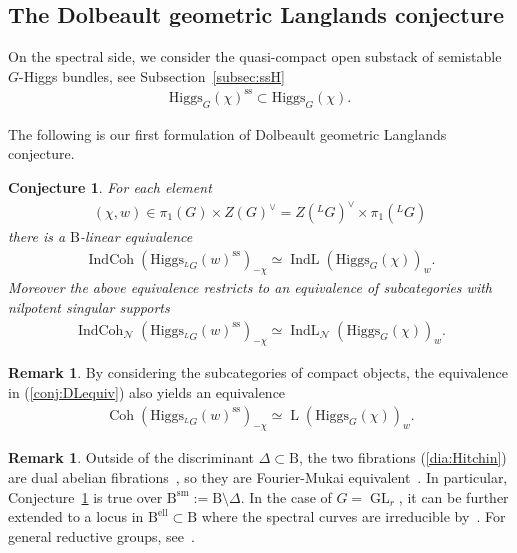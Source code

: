 \documentclass [11pt,oneside,a4paper,mathscr]{amsart}
\newtheorem{conj}[thm]{Conjecture}
\theoremstyle{definition}
\newtheorem{remark}[thm]{Remark}
\newcommand{\LL}{\operatorname{L}}
\newcommand{\Coh}{\operatorname{Coh}}
\newcommand{\IndCoh}{\operatorname{IndCoh}}
\newcommand{\IndL}{\operatorname{IndL}}
\newcommand{\GL}{\operatorname{GL}}
\newcommand{\Hig}{\mathrm{Higgs}}
\begin{document}
\subsection{The Dolbeault geometric Langlands conjecture}\label{subsec:DGLC}
On the spectral side, we consider the quasi-compact open substack of 
semistable $G$-Higgs bundles, see Subsection~\ref{subsec:ssH}
\begin{align*}
\Hig_G(\chi)^{\mathrm{ss}} \subset \Hig_G(\chi). 
\end{align*}

The following is our first formulation of Dolbeault geometric Langlands conjecture. 

\begin{conj}\label{conj:DL0}
For each element 
\begin{align*}
(\chi, w) \in \pi_1(G)\times Z(G)^{\vee}=Z(^{L}G)^{\vee}\times \pi_1(^{L}G)
\end{align*}
there is a $\mathrm{B}$-linear equivalence 
\begin{align}\label{conj:DLequiv}
    \IndCoh(\Hig_{^{L}G}(w)^{\mathrm{ss}})_{-\chi} \simeq \IndL(\Hig_{G}(\chi))_w.
\end{align}
Moreover the above equivalence restricts to an equivalence of subcategories with nilpotent singular supports
\begin{align}\label{conj:DLequiv:nilp}
    \IndCoh_{\mathcal{N}}(\Hig_{^{L}G}(w)^{\mathrm{ss}})_{-\chi} \simeq \IndL_{\mathcal{N}}(\Hig_{G}(\chi))_w.
\end{align}
\end{conj}
\begin{remark}
By considering the subcategories of compact objects, the equivalence in (\ref{conj:DLequiv})
also yields an equivalence 
\begin{align}\label{conj:DL2}
\Coh(\Hig_{^{L}G}(w)^{\mathrm{ss}})_{-\chi} \simeq \LL(\Hig_{G}(\chi))_w.
\end{align}
\end{remark}
\begin{remark}\label{rmk:dual}
    Outside of the discriminant $\Delta \subset \mathrm{B}$, the two fibrations (\ref{dia:Hitchin}) are dual 
    abelian fibrations~\cite{DoPa}, so they are Fourier-Mukai equivalent~\cite{Mu1}. In particular, 
    Conjecture~\ref{conj:DL0} is true over $\mathrm{B}^{\mathrm{sm}}:=\mathrm{B}\setminus \Delta$. In the case of $G=\GL_r$, it can be 
    further extended to a locus in $\mathrm{B}^{\mathrm{ell}}\subset \mathrm{B}$ where the spectral curves are irreducible by~\cite{Ardual}. For general reductive groups, see~\cite{ArFe}.
\end{remark}
\end{document}
